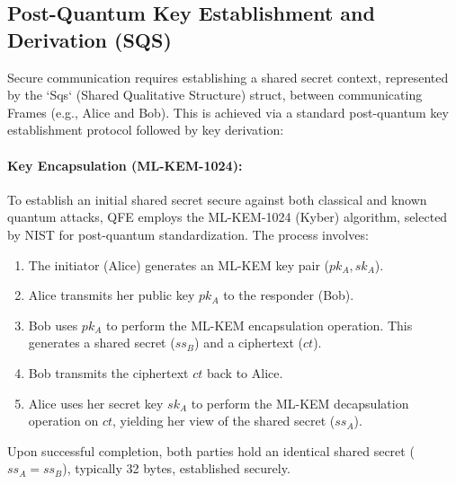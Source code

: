 \documentclass[11pt]{article}
\begin{document}
	\subsection{Post-Quantum Key Establishment and Derivation (SQS)}
	Secure communication requires establishing a shared secret context, represented by the `Sqs` (Shared Qualitative Structure) struct, between communicating Frames (e.g., Alice and Bob). This is achieved via a standard post-quantum key establishment protocol followed by key derivation:
	
	\paragraph{Key Encapsulation (ML-KEM-1024):} To establish an initial shared secret secure against both classical and known quantum attacks, QFE employs the ML-KEM-1024 (Kyber) algorithm, selected by NIST for post-quantum standardization. The process involves:
	\begin{enumerate}
		\item The initiator (Alice) generates an ML-KEM key pair ($pk_A, sk_A$).
		\item Alice transmits her public key $pk_A$ to the responder (Bob).
		\item Bob uses $pk_A$ to perform the ML-KEM encapsulation operation. This generates a shared secret ($ss_B$) and a ciphertext ($ct$).
		\item Bob transmits the ciphertext $ct$ back to Alice.
		\item Alice uses her secret key $sk_A$ to perform the ML-KEM decapsulation operation on $ct$, yielding her view of the shared secret ($ss_A$).
	\end{enumerate}
	Upon successful completion, both parties hold an identical shared secret ($ss_A = ss_B$), typically 32 bytes, established securely.
	
\end{document}
